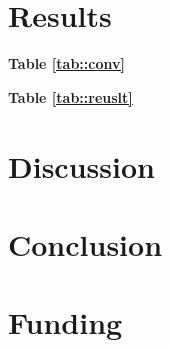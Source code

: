 \documentclass[twocolumn, 8pt]{article}
\begin{document}
\lipsum[3-9]

\section*{Results}

\lipsum[3] \textbf{Table \ref{tab::conv}}

\textbf{Table \ref{tab::reuslt}} \lipsum[4]

\section*{Discussion}

\lipsum[3-6]

\section*{Conclusion}

\lipsum[3-4]

\section*{Funding}
\lipsum[3-4]


{\footnotesize }
\end{document}
